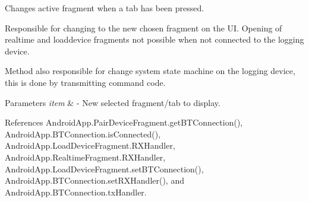 Changes active fragment when a tab has been pressed. 

Responsible for changing to the new chosen fragment on the UI. Opening of realtime and loaddevice fragments not possible when not connected to the logging device.

Method also responsible for change system state machine on the logging device, this is done by transmitting command code.


\begin{DoxyParams}{Parameters}
{\em item} & -\/ New selected fragment/tab to display. \\
\hline
\end{DoxyParams}


References Android\+App.\+Pair\+Device\+Fragment.\+get\+B\+T\+Connection(), Android\+App.\+B\+T\+Connection.\+is\+Connected(), Android\+App.\+Load\+Device\+Fragment.\+R\+X\+Handler, Android\+App.\+Realtime\+Fragment.\+R\+X\+Handler, Android\+App.\+Load\+Device\+Fragment.\+set\+B\+T\+Connection(), Android\+App.\+B\+T\+Connection.\+set\+R\+X\+Handler(), and Android\+App.\+B\+T\+Connection.\+tx\+Handler.


